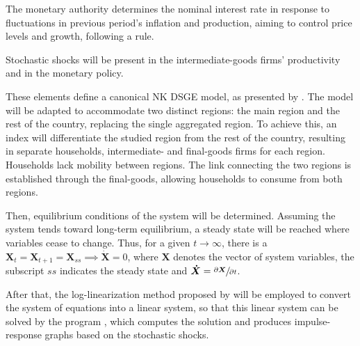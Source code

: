 \documentclass[../thesis.tex]{subfiles}
\begin{document}
	The monetary authority determines the nominal interest rate in response to fluctuations in previous period's inflation and production, aiming to control price levels and growth, following a \textcite{taylor_discretion_1993} rule.
	
	Stochastic shocks will be present in the intermediate-goods firms' productivity and in the monetary policy.
	
	
	These elements define a canonical NK DSGE model, as presented by \cite{solis-garcia_ucb_2022}. The model will be adapted to accommodate two distinct regions: the main region and the rest of the country, replacing the single aggregated region. To achieve this, an index will differentiate the studied region from the rest of the country, resulting in separate households, intermediate- and final-goods firms for each region. Households lack mobility between regions. The link connecting the two regions is established through the final-goods, allowing households to consume from both regions.

	Then, equilibrium conditions of the system will be determined. Assuming the system tends toward long-term equilibrium, a steady state will be reached where variables cease to change. Thus, for a given $t \to \infty$, there is a $\boldsymbol{X}_t = \boldsymbol{X}_{t+1} = \boldsymbol{X}_{ss} \implies \boldsymbol{\dot{X}} = 0$, where $\boldsymbol{X}$ denotes the vector of system variables, the subscript $ss$ indicates the steady state and $\boldsymbol{\dot{X}} = \sfrac{\partial \boldsymbol{X}}{\partial t}$. 
	
	After that, the log-linearization method proposed by \textcite{uhlig_toolkit_1999} will be employed to convert the system of equations into a linear system, so that this linear system can be solved by the program \dynare{}, which computes the solution and produces impulse-response graphs based on the stochastic shocks.
\end{document}

